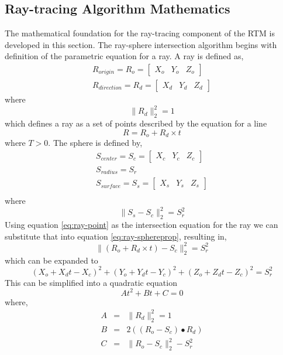 \subsection{Ray-tracing Algorithm Mathematics}
The mathematical foundation for the ray-tracing component of the RTM is developed in this section. The ray-sphere intersection algorithm begins with definition of the parametric equation for a ray. A ray is defined as,
\begin{equation}
\begin{split}
R_{origin} = R_o = \left[ \begin{matrix} X_o&Y_o&Z_o \end{matrix}\right]\\
R_{direction} = R_d = \left[ \begin{matrix} X_d&Y_d&Z_d \end{matrix}\right]
\end{split}
\end{equation}
where
\begin{equation}
\|R_d\|_2^2 = 1
\end{equation}
which defines a ray as a set of points described by the equation for a line
\begin{equation}\label{eq:ray-point}
R = R_o + R_d \times t
\end{equation}
where $T>0$. The sphere is defined by,
\begin{equation}
\begin{split}
S_{center} = S_c = \left[ \begin{matrix} X_c&Y_c&Z_c \end{matrix}\right]\\
S_{radius} = S_r \\
S_{surface} = S_s = \left[ \begin{matrix} X_s&Y_s&Z_s \end{matrix}\right]\\
\end{split}
\end{equation}
where
\begin{equation} \label{eq:ray-sphereprop}
\| S_s - S_c \|_2^2 = S_r^2
\end{equation}
Using equation \ref{eq:ray-point} as the intersection equation for the ray we can substitute that into equation \ref{eq:ray-sphereprop}, resulting in,
\begin{equation}
\| (R_o +R_d \times t) - S_c \|_2^2 = S_r^2
\end{equation}
which can be expanded to
\begin{equation}
(X_o +X_dt - X_c)^2 + (Y_o +Y_dt - Y_c)^2 + (Z_o +Z_dt - Z_c)^2 = S_r^2
\end{equation}
This can be simplified into a quadratic equation
\begin{equation}
At^2 + Bt+C =0
\end{equation}
where,
\begin{eqnarray}
A &=& \|R_d\|_2^2 = 1\\
B &=& 2 \left( \left( R_o -S_c \right) \bullet R_d \right)\\
C &=& \| R_o - S_c \|_2^2 - S_r^2
\end{eqnarray}

